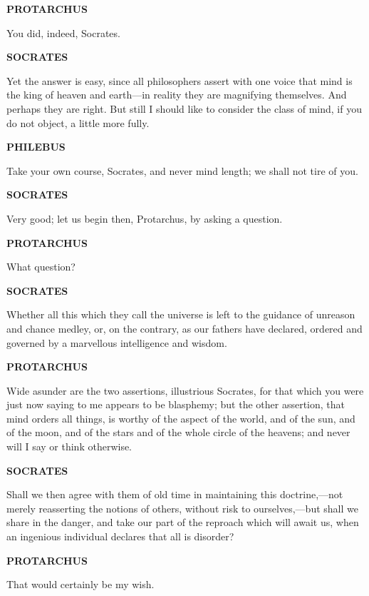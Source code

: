 \documentclass[11pt,letter]{article}
\begin{document}
\par \textbf{PROTARCHUS}
\par   You did, indeed, Socrates.

\par \textbf{SOCRATES}
\par   Yet the answer is easy, since all philosophers assert with one voice that mind is the king of heaven and earth—in reality they are magnifying themselves. And perhaps they are right. But still I should like to consider the class of mind, if you do not object, a little more fully.

\par \textbf{PHILEBUS}
\par   Take your own course, Socrates, and never mind length; we shall not tire of you.

\par \textbf{SOCRATES}
\par   Very good; let us begin then, Protarchus, by asking a question.

\par \textbf{PROTARCHUS}
\par   What question?

\par \textbf{SOCRATES}
\par   Whether all this which they call the universe is left to the guidance of unreason and chance medley, or, on the contrary, as our fathers have declared, ordered and governed by a marvellous intelligence and wisdom.

\par \textbf{PROTARCHUS}
\par   Wide asunder are the two assertions, illustrious Socrates, for that which you were just now saying to me appears to be blasphemy; but the other assertion, that mind orders all things, is worthy of the aspect of the world, and of the sun, and of the moon, and of the stars and of the whole circle of the heavens; and never will I say or think otherwise.

\par \textbf{SOCRATES}
\par   Shall we then agree with them of old time in maintaining this doctrine,—not merely reasserting the notions of others, without risk to ourselves,—but shall we share in the danger, and take our part of the reproach which will await us, when an ingenious individual declares that all is disorder?

\par \textbf{PROTARCHUS}
\par   That would certainly be my wish.
\end{document}
